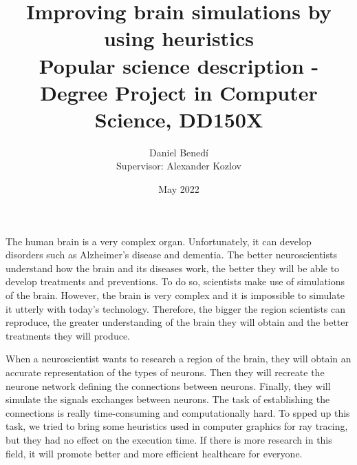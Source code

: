 \documentclass{article}
\title{ Improving brain simulations by using heuristics \\ Popular science description - Degree Project in Computer Science, DD150X}
\author{Daniel Benedí \\ Supervisor: Alexander Kozlov}
\date{May 2022}
\begin{document}
\maketitle

The human brain is a very complex organ. Unfortunately, it can develop disorders
such as Alzheimer's disease and dementia. The better neuroscientists understand
how the brain and its diseases work, the better they will be able to develop 
treatments and preventions. To do so, scientists make use of simulations of the 
brain. However, the brain is very complex and it is impossible to simulate it
utterly with today's technology. Therefore, the bigger the region scientists can
reproduce, the greater understanding of the brain they will obtain and the better 
treatments they will produce.

When a neuroscientist wants to research a region of the brain, they will obtain 
an accurate representation of the types of neurons. Then they will recreate the 
neurone network defining the connections between neurons. Finally, they will 
simulate the signals exchanges between neurons. The task of establishing the 
connections is really time-consuming and computationally hard. To spped up this
task, we tried to bring some heuristics used in computer graphics for ray tracing,
but they had no effect on the execution time. If there is more research in this 
field, it will promote better and more efficient healthcare for everyone.
\end{document}
